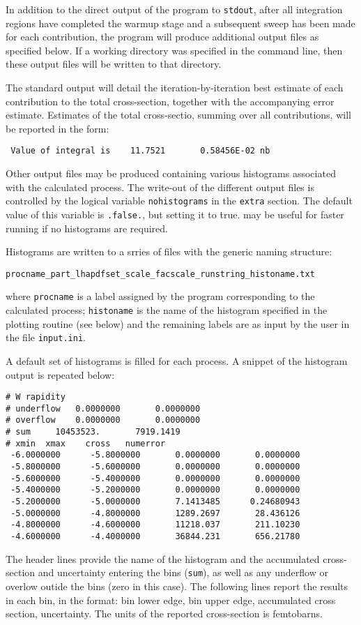 \label{sec:output}

In addition to the direct output of the program to {\tt stdout}, after
all integration regions have completed the warmup stage and a subsequent
sweep has been made for each contribution, the program will
produce additional output files as specified below.
If a working directory was specified in the command line, then these
output files will be written to that directory.

The standard output will detail the iteration-by-iteration best estimate
of each contribution to the total cross-section, together with the
accompanying error estimate.  Estimates of the total cross-sectio, summing
over all contributions, will be reported in the form:
\begin{verbatim}
 Value of integral is    11.7521       0.58456E-02 nb 
\end{verbatim}

Other output files may be produced containing various histograms associated
with the calculated process. The write-out of the different output files
is controlled by the logical variable {\tt nohistograms} in the {\tt extra}
section.  The default value of this variable is {\tt .false.}, but setting it
to {\.true.} may be useful for faster running if no histograms are required.

Histograms are written to a srries of files with the generic naming structure:
\begin{verbatim}
procname_part_lhapdfset_scale_facscale_runstring_histoname.txt
\end{verbatim}
where {\tt procname} is a label assigned by the program corresponding to
the calculated process; {\tt histoname} is the name of the histogram specified
in the plotting routine (see below) and the remaining labels are as input
by the user in the file {\tt input.ini}.

A default set of histograms is filled for each process.  A snippet of
the histogram output is repeated below:
\begin{verbatim}
# W rapidity
# underflow	  0.0000000    	  0.0000000
# overflow	  0.0000000    	  0.0000000
# sum	  10453523.    	  7919.1419
# xmin	xmax	cross	numerror
 -6.0000000    	 -5.8000000    	  0.0000000    	  0.0000000
 -5.8000000    	 -5.6000000    	  0.0000000    	  0.0000000
 -5.6000000    	 -5.4000000    	  0.0000000    	  0.0000000
 -5.4000000    	 -5.2000000    	  0.0000000    	  0.0000000
 -5.2000000    	 -5.0000000    	  7.1413485    	 0.24680943
 -5.0000000    	 -4.8000000    	  1289.2697    	  28.436126
 -4.8000000    	 -4.6000000    	  11218.037    	  211.10230
 -4.6000000    	 -4.4000000    	  36844.231    	  656.21780
\end{verbatim}
The header lines provide the name of the histogram and the accumulated
cross-section and uncertainty entering the bins ({\tt sum}),
as well as any underflow or overlow outide the bins (zero in this case).
The following lines report the results in each bin, in the format:
bin lower edge, bin upper edge, accumulated cross section, uncertainty.
The units of the reported cross-section is femtobarns.

